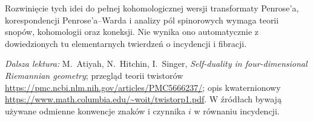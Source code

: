 Rozwinięcie tych idei do pełnej kohomologicznej
wersji transformaty Penrose'a, korespondencji Penrose'a--Warda
i analizy pól spinorowych wymaga teorii
snopów, kohomologii oraz koneksji.
Nie wynika ono automatycznie z dowiedzionych
tu elementarnych twierdzeń o incydencji
i fibracji.

\par\smallskip
{\footnotesize\noindent\emph{Dalsza lektura:}
M.~Atiyah, N.~Hitchin, I.~Singer,
\emph{Self-duality in four-dimensional Riemannian geometry};
przegląd teorii twistorów
\url{https://pmc.ncbi.nlm.nih.gov/articles/PMC5666237/};
opis kwaternionowy
\url{https://www.math.columbia.edu/~woit/twistorp1.pdf}.
W źródłach bywają używane odmienne konwencje
znaków i czynnika $i$ w równaniu incydencji.\par}
\clearpage
